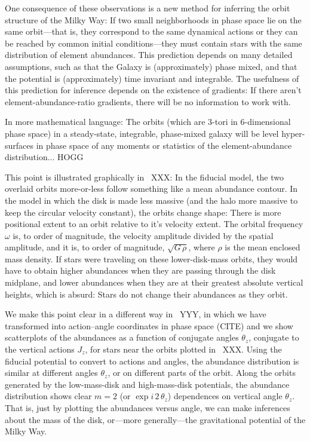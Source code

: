 \documentclass[modern]{aastex63}
\begin{document}
One consequence of these observations is a new method for inferring
the orbit structure of the Milky Way:
If two small neighborhoods in phase space lie on the same orbit---that
is, they correspond to the same dynamical actions or they can be reached
by common initial conditions---they must contain stars with the same distribution of
element abundances.
This prediction depends on many detailed assumptions, such as that
the Galaxy is (approximately) phase mixed, and that the potential is
(approximately) time invariant and integrable.
The usefulness of this prediction for inference
depends on the existence of gradients: If there aren't
element-abundance-ratio gradients, there will be no information to work
with.

In more mathematical language: The orbits (which are 3-tori in
6-dimensional phase space) in a steady-state, integrable, phase-mixed
galaxy will be level hyper-surfaces in phase space of any moments or
statistics of the element-abundance distribution... HOGG

This point is illustrated graphically in \figurename~XXX:
In the fiducial model, the two overlaid orbits more-or-less follow something
like a mean abundance contour.
In the model in which the disk is made less massive (and the halo more massive
to keep the circular velocity constant), the orbits change shape: There is more
positional extent to an orbit relative to it's velocity extent.
The orbital frequency $\omega$ is, to order of magnitude, the velocity amplitude
divided by the spatial amplitude, and it is, to order of magnitude, $\sqrt{G\,\rho}$,
where $\rho$ is the mean enclosed mass density.
If stars were traveling on these lower-disk-mass orbits, they would have to
obtain higher abundances when they are passing through the disk midplane,
and lower abundances when they are at their greatest absolute vertical heights,
which is absurd: Stars do not change their abundances as they orbit.

We make this point clear in a different way in \figurename~YYY, in which
we have transformed into action--angle coordinates in phase space (CITE)
and we show scatterplots of the abundances as a function of conjugate
angles $\theta_z$, conjugate to the vertical actions $J_z$, for stars near
the orbits plotted in \figurename~XXX.
Using the fiducial potential to convert to actions and angles,
the abundance distribution is similar at different
angles $\theta_z$, or on different parts of the orbit.
Along the orbits generated by the low-mass-disk and high-mass-disk potentials,
the abundance distribution shows clear $m=2$ (or $\exp i\,2\,\theta_z$) dependences
on vertical angle $\theta_z$.
That is, just by plotting the abundances versus angle, we can make
inferences about the mass of the disk, or---more generally---the
gravitational potential of the Milky Way.
\end{document}
